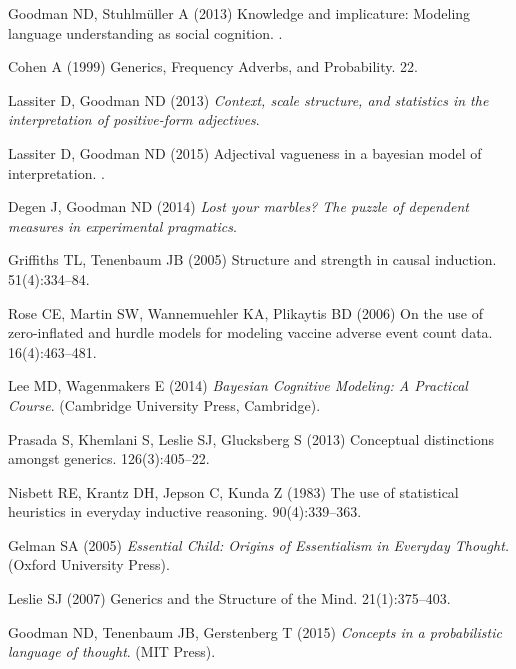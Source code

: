 \documentclass{pnastwo}
\begin{document}
\begin{article}
\begin{thebibliography}{10}
Goodman ND, Stuhlm{\"u}ller A (2013) Knowledge and implicature: Modeling
  language understanding as social cognition.
.

Cohen A (1999) {Generics, Frequency Adverbs, and Probability}.
 22.

Lassiter D, Goodman ND (2013) {\em Context, scale structure, and statistics in
  the interpretation of positive-form adjectives}.

Lassiter D, Goodman ND (2015) Adjectival vagueness in a bayesian model of
  interpretation.
.

Degen J, Goodman ND (2014) {\em Lost your marbles? The puzzle of dependent
  measures in experimental pragmatics}.

Griffiths TL, Tenenbaum JB (2005) {Structure and strength in causal induction.}
 51(4):334--84.

Rose CE, Martin SW, Wannemuehler KA, Plikaytis BD (2006) On the use of
  zero-inflated and hurdle models for modeling vaccine adverse event count
  data.
 16(4):463--481.

Lee MD, Wagenmakers E (2014) {\em Bayesian Cognitive Modeling: A Practical
  Course}.
\newblock (Cambridge University Press, Cambridge).

Prasada S, Khemlani S, Leslie SJ, Glucksberg S (2013) {Conceptual distinctions
  amongst generics.}
 126(3):405--22.

Nisbett RE, Krantz DH, Jepson C, Kunda Z (1983) {The use of statistical
  heuristics in everyday inductive reasoning.}
 90(4):339--363.

Gelman SA (2005) {\em Essential Child: Origins of Essentialism in Everyday
  Thought.}
\newblock (Oxford University Press).

Leslie SJ (2007) {Generics and the Structure of the Mind}.
 21(1):375--403.

Goodman ND, Tenenbaum JB, Gerstenberg T (2015) {\em Concepts in a probabilistic
  language of thought}.
\newblock (MIT Press).


\end{thebibliography}
\end{article}
\end{document}
